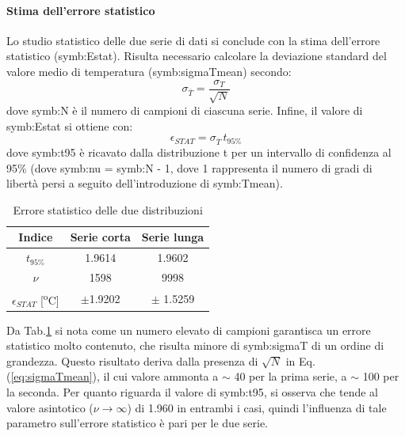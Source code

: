 \paragraph{Stima dell'errore statistico}
Lo studio statistico delle due serie di dati si conclude con la stima dell'errore statistico (\gls{symb:Estat}).  Risulta necessario calcolare la deviazione standard del valore medio di temperatura (\gls{symb:sigmaTmean}) secondo:
\begin{equation}
	\sigma_{\overline{T}} = \frac{\sigma_{T}}{\sqrt{N}} \label{eq:sigmaTmean}
\end{equation}
dove \gls{symb:N} è il numero di campioni di ciascuna serie.
Infine, il valore di \gls{symb:Estat} si ottiene con:
\begin{equation}
	\epsilon_{\textit{STAT}}=\sigma_{\overline{T}}\,t_{\textit{95\%}}
\end{equation}
dove \gls{symb:t95} è ricavato dalla distribuzione t per un intervallo di confidenza al 95\% (dove \gls{symb:nu} = \gls{symb:N} - 1, dove 1 rappresenta il numero di gradi di libertà persi a seguito dell'introduzione di \gls{symb:Tmean}).
\begin{table} [H]
	\centering
	\begin{tabular}{c|c|c}
		\toprule
		\toprule
		\textbf{Indice} & \textbf{Serie corta}&\textbf{Serie lunga}\\
		\midrule
		\midrule
		$t_{\textit{95\%}}$ &1.9614&1.9602\\
		\midrule
		$\nu$ & 1598 & 9998\\
		\midrule
		$\epsilon_{\textit{STAT}}$  [\textsuperscript{o}C]& $\pm $1.9202 &  $ \pm$ 1.5259\\
		\bottomrule
		\bottomrule
	\end{tabular}
	\caption{Errore statistico delle due distribuzioni}
	\label{tab:errorestat}
\end{table}

Da Tab.\ref{tab:errorestat} si nota come un numero elevato di campioni garantisca un errore statistico molto contenuto, che risulta minore di \gls{symb:sigmaT} di un ordine di grandezza. Questo risultato deriva dalla presenza di $\sqrt{N}$ in Eq.(\ref{eq:sigmaTmean}), il cui valore ammonta a $\sim$ 40 per la prima serie, a $\sim$ 100 per la seconda. Per quanto riguarda il valore di \gls{symb:t95}, si osserva che tende al valore asintotico ($\nu \rightarrow \infty $) di 1.960 in entrambi i casi, quindi l'influenza di tale parametro sull'errore statistico è pari per le due serie.